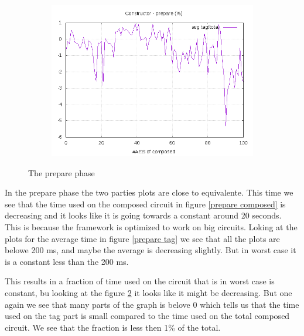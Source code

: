 \documentclass[10pt,a4paper]{article}
\begin{document}
\begin{figure}[h]
\begin{subfigure}[t]{0.3\textwidth}
        \includegraphics[width=\textwidth]{const_prepare_frac}
        \caption{}
        \label{prepare frac}
    \end{subfigure}
    \caption{The prepare phase}
\end{figure}

In the prepare phase the two parties plots are close to equivalente. This time we see that the time used on the composed circuit in figure \ref{prepare composed} is decreasing and it looks like it is going towards a constant around 20 seconds. This is because the framework is optimized to work on big circuits.
Loking at the plots for the average time in figure \ref{prepare tag} we see that all the plots are belowe 200 ms, and maybe the average is decreasing slightly. But in worst case it is a constant less than the 200 ms.

This results in a fraction of time used on the circuit that is in worst case is constant, bu looking at the figure \ref{prepare frac} it looks like it might be decreasing. But one again we see that many parts of the graph is belove 0 which tells us that the time used on the tag part is small compared to the time used on the total composed circuit. We see that the fraction is less then 1\% of the total.
\end{document}
